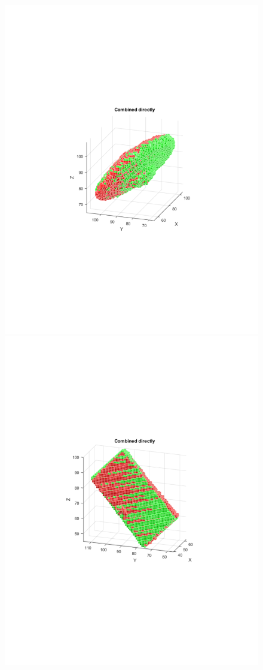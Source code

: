 \documentclass{UCF_ETD}
\begin{document}
\begin{figure}[H]
\begin{center}
\includegraphics[scale=0.35]{RobustRegistration/NoiselessAnomaliesResult2}
\includegraphics[scale=0.35]{RobustRegistration/NoiselessAnomaliesResult3}

\end{center}
\end{figure}
\end{document}
